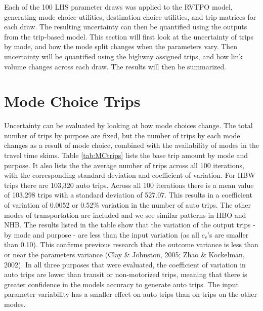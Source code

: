 \documentclass[fancy, masters, twoside]{byuthesis}
\begin{document}
Each of the 100 LHS parameter draws was applied to the RVTPO model, generating mode choice utilities, destination choice utilities, and trip matrices for each draw. The resulting uncertainty can then be quantified using the outputs from the trip-based model. This section will first look at the uncertainty of trips by mode, and how the mode split changes when the parameters vary. Then uncertainty will be quantified using the highway assigned trips, and how link volume changes across each draw. The results will then be summarized.

\hypertarget{mode-choice-trips}{%
\section{Mode Choice Trips}\label{mode-choice-trips}}

Uncertainty can be evaluated by looking at how mode choices change. The total number of trips by purpose are fixed, but the number of trips by each mode changes as a result of mode choice, combined with the availability of modes in the travel time skims. Table \ref{tab:MCtrips} lists the base trip amount by mode and purpose. It also lists the the average number of trips across all 100 iterations, with the corresponding standard deviation and coefficient of variation. For HBW trips there are 103,320 auto trips. Across all 100 iterations there is a mean value of 103,298 trips with a standard deviation of 527.07. This results in a coefficient of variation of 0.0052 or 0.52\% variation in the number of auto trips. The other modes of transportation are included and we see similar patterns in HBO and NHB. The results listed in the table show that the variation of the output trips - by mode and purpose - are less than the input variation (as all \(c_v\)'s are smaller than 0.10). This confirms previous research that the outcome variance is less than or near the parameters variance (Clay \& Johnston, 2005; Zhao \& Kockelman, 2002). In all three purposes that were evaluated, the coefficient of variation in auto trips are lower than transit or non-motorized trips, meaning that there is greater confidence in the models accuracy to generate auto trips. The input parameter variability has a smaller effect on auto trips than on trips on the other modes.
\end{document}
